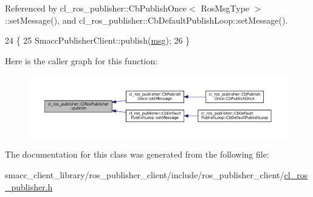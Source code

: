 Referenced by cl\+\_\+ros\+\_\+publisher\+::\+Cb\+Publish\+Once$<$ Ros\+Msg\+Type $>$\+::set\+Message(), and cl\+\_\+ros\+\_\+publisher\+::\+Cb\+Default\+Publish\+Loop\+::set\+Message().


\begin{DoxyCode}
24     \{
25         SmaccPublisherClient::publish(\hyperlink{namespacebattery__monitor__node_ab1920c64448816edd4064e494275fdff}{msg});
26     \}
\end{DoxyCode}
Here is the caller graph for this function\+:
\nopagebreak
\begin{figure}[H]
\begin{center}
\leavevmode
\includegraphics[width=350pt]{classcl__ros__publisher_1_1ClRosPublisher_a3517d62fb0703a0a72efe6de7ad1a6d8_icgraph}
\end{center}
\end{figure}


The documentation for this class was generated from the following file\+:\begin{DoxyCompactItemize}
\item 
smacc\+\_\+client\+\_\+library/ros\+\_\+publisher\+\_\+client/include/ros\+\_\+publisher\+\_\+client/\hyperlink{cl__ros__publisher_8h}{cl\+\_\+ros\+\_\+publisher.\+h}\end{DoxyCompactItemize}
